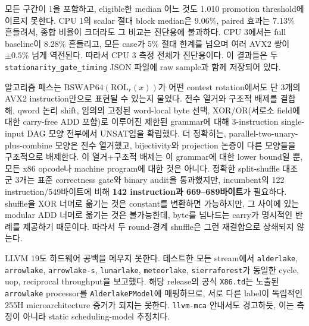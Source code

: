 \documentclass[11pt,a4paper]{article}
\begin{document}
모든 구간이 1을 포함하고, eligible한 median 어느 것도 1.010 promotion
threshold에 이르지 못한다.  CPU 1의 scalar 절대 block median은 9.06\%,
paired 효과는 7.13\% 흔들려서, 종합 비율이 크더라도 그 비교는
진단용에 불과하다.  CPU 3에서는 full baseline이 8.28\% 흔들리고, 모든
case가 5\% 절대 한계를 넘으며 여러 AVX2 쌍이 $\pm0.5\%$ 넘게
역전된다.  따라서 CPU 3 측정 전체가 진단용이다.  이 결과들은 두
\texttt{stationarity\_gate\_timing} JSON 파일에 raw sample과 함께
저장되어 있다.

알고리즘 패스는 $\mathrm{BSWAP64}(\mathrm{ROL}_r(x))$가 어떤
contest rotation에서도 단 3개의 AVX2 instruction만으로 표현될 수
있는지 물었다.  전수 열거와 구조적 배제를 결합해, qword 논리 shift,
임의의 고정된 word-local byte 선택, XOR/OR(서로소 field에 대한
carry-free ADD 포함)로 이루어진 제한된 grammar에 대해 3-instruction
single-input DAG 모양 전부에서 UNSAT임을 확립했다.  더 정확히는,
parallel-two-unary-plus-combine 모양은 전수 열거했고, bijectivity와
projection 논증이 다른 모양들을 구조적으로 배제한다.  이 열거+구조적
배제는 이 grammar에 대한 lower bound일 뿐, 모든 x86 opcode나 machine
program에 대한 것은 아니다.  정확한 split-shuffle 대조군 3개는 표준
correctness gate와 binary audit을 통과했지만, incumbent의 122
instruction/549바이트에 비해 \textbf{142 instruction과 669--689바이트}가
필요하다.  shuffle을 XOR 너머로 옮기는 것은 constant를 변환하면
가능하지만, 그 사이에 있는 modular ADD 너머로 옮기는 것은 불가능한데,
byte를 넘나드는 carry가 명시적인 반례를 제공하기 때문이다.  따라서 두
round-경계 shuffle은 그런 재결합으로 상쇄되지 않는다.

LLVM 19도 하드웨어 공백을 메우지 못한다.  테스트한 모든 stream에서
\texttt{alderlake}, \texttt{arrowlake}, \texttt{arrowlake-s},
\texttt{lunarlake}, \texttt{meteorlake}, \texttt{sierraforest}가 동일한
cycle, uop, reciprocal throughput을 보고했다.  해당 release의 공식
\texttt{X86.td}는 노출된 \texttt{arrowlake} processor를
\texttt{AlderlakePModel}에 매핑하므로, 서로 다른 label이 독립적인
255H microarchitecture 증거가 되지는 못한다.  \texttt{llvm-mca}
안내서도 경고하듯, 이는 측정이 아니라 static scheduling-model
추정치다.
\end{document}
